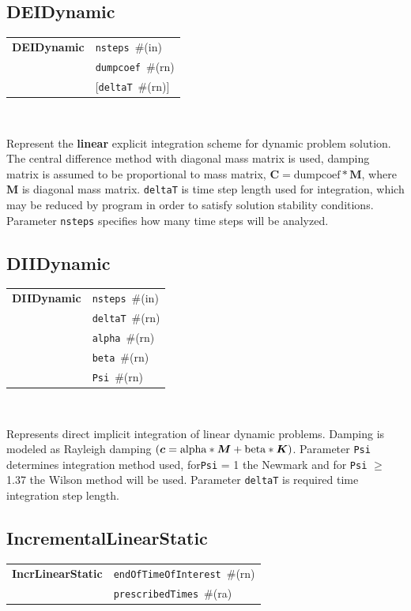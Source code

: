 \documentclass[a4paper]{article}
\makeatletter
\newcommand{\mbf}[1]{\boldsymbol{#1}}
\newcommand{\param}[1]{\texttt{#1}} %
\newcommand{\optional}[1]{[#1]} %
\newcommand{\field}[2]{\param{#1}~\#{\tiny(#2)}} %
\newcommand{\optField}[2]{\optional{\field{#1}{#2}}}
\newcommand{\entKeywordInst}[1]{\textbf{#1}} %
\newenvironment{record}[1][]{\begin{tabular}{|ll}}{\end{tabular}\\}
\newcommand{\recentry}[2]{{#1}&{#2}\\}
\newcounter{rcc}
\newenvironment{record}[1][\textwidth]{\setcounter{rcc}{0}\begin{tabular*}{#1}{|ll@{\extracolsep{\fill}}r}}{\end{tabular*}\\}
\newcommand{\recentry}[2]{\ifthenelse{\value{rcc}>0}{&$\backslash$ \\}{\setcounter{rcc}{1}}{#1}&{#2}}
\makeatother
\begin{document}
\subsection{DEIDynamic}
\label{DEIDynamic}

\begin{record}
  \recentry{\entKeywordInst{DEIDynamic}}{\field{nsteps}{in}}
  \recentry{}{\field{dumpcoef}{rn}}
  \recentry{}{\optField{deltaT}{rn}}
\end{record}

Represent the \textbf{linear} explicit
integration scheme for dynamic problem solution. The central difference method with diagonal mass matrix is used,
damping matrix is assumed to be proportional to mass matrix, $\mbf{C} = \mathrm{dumpcoef} * \mbf{M}$, where
$\mbf{M}$ is diagonal mass matrix. \param{deltaT} is time step length used for
integration, which may be reduced by program in order to satisfy
solution stability conditions. Parameter \param{nsteps} specifies
how many time steps will be analyzed.

\subsection{DIIDynamic}
\label{DIIDynamic}

\begin{record}
  \recentry{\entKeywordInst{DIIDynamic}}{\field{nsteps}{in}}
  \recentry{}{\field{deltaT}{rn}}
  \recentry{}{\field{alpha}{rn}}
  \recentry{}{\field{beta}{rn}}
  \recentry{}{\field{Psi}{rn}}
\end{record}

Represents direct implicit integration of linear dynamic
problems. Damping is modeled as Rayleigh damping $(\mbf{c} =
\rm{alpha}*\mbf{M} + \rm{beta} * \mbf{K})$. Parameter \param{Psi} determines
integration method used, for\param{Psi} = 1 the Newmark and for \param{Psi} $\ge$ 1.37 the Wilson method
will be used. Parameter \param{deltaT} is required time integration
step length.

\subsection{IncrementalLinearStatic}
\label{IncrementalLinearStatic}

\begin{record}
  \recentry{\entKeywordInst{IncrLinearStatic}}{\field{endOfTimeOfInterest}{rn}}
  \recentry{}{\field{pre\-scri\-bed\-Ti\-mes}{ra}}
\end{record}
\end{document}
